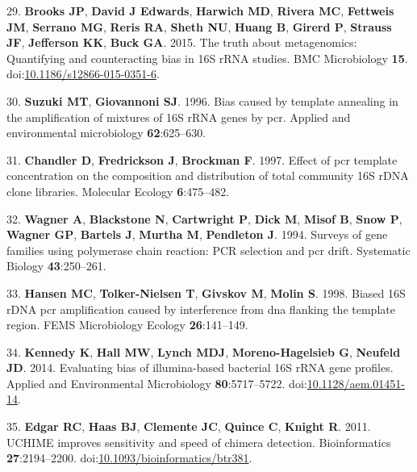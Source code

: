 \documentclass[11pt,]{article}
\begin{document}
\leavevmode\hypertarget{ref-Brooks2015}{}%
29. \textbf{Brooks JP}, \textbf{David J Edwards}, \textbf{Harwich MD},
\textbf{Rivera MC}, \textbf{Fettweis JM}, \textbf{Serrano MG},
\textbf{Reris RA}, \textbf{Sheth NU}, \textbf{Huang B}, \textbf{Girerd
P}, \textbf{Strauss JF}, \textbf{Jefferson KK}, \textbf{Buck GA}. 2015.
The truth about metagenomics: Quantifying and counteracting bias in 16S
rRNA studies. BMC Microbiology \textbf{15}.
doi:\href{https://doi.org/10.1186/s12866-015-0351-6}{10.1186/s12866-015-0351-6}.

\leavevmode\hypertarget{ref-Suzuki1996}{}%
30. \textbf{Suzuki MT}, \textbf{Giovannoni SJ}. 1996. Bias caused by
template annealing in the amplification of mixtures of 16S rRNA genes by
pcr. Applied and environmental microbiology \textbf{62}:625--630.

\leavevmode\hypertarget{ref-Chandler1997}{}%
31. \textbf{Chandler D}, \textbf{Fredrickson J}, \textbf{Brockman F}.
1997. Effect of pcr template concentration on the composition and
distribution of total community 16S rDNA clone libraries. Molecular
Ecology \textbf{6}:475--482.

\leavevmode\hypertarget{ref-Wagner1994}{}%
32. \textbf{Wagner A}, \textbf{Blackstone N}, \textbf{Cartwright P},
\textbf{Dick M}, \textbf{Misof B}, \textbf{Snow P}, \textbf{Wagner GP},
\textbf{Bartels J}, \textbf{Murtha M}, \textbf{Pendleton J}. 1994.
Surveys of gene families using polymerase chain reaction: PCR selection
and pcr drift. Systematic Biology \textbf{43}:250--261.

\leavevmode\hypertarget{ref-Hansen1998}{}%
33. \textbf{Hansen MC}, \textbf{Tolker-Nielsen T}, \textbf{Givskov M},
\textbf{Molin S}. 1998. Biased 16S rDNA pcr amplification caused by
interference from dna flanking the template region. FEMS Microbiology
Ecology \textbf{26}:141--149.

\leavevmode\hypertarget{ref-Kennedy2014}{}%
34. \textbf{Kennedy K}, \textbf{Hall MW}, \textbf{Lynch MDJ},
\textbf{Moreno-Hagelsieb G}, \textbf{Neufeld JD}. 2014. Evaluating bias
of illumina-based bacterial 16S rRNA gene profiles. Applied and
Environmental Microbiology \textbf{80}:5717--5722.
doi:\href{https://doi.org/10.1128/aem.01451-14}{10.1128/aem.01451-14}.

\leavevmode\hypertarget{ref-Edgar2011}{}%
35. \textbf{Edgar RC}, \textbf{Haas BJ}, \textbf{Clemente JC},
\textbf{Quince C}, \textbf{Knight R}. 2011. UCHIME improves sensitivity
and speed of chimera detection. Bioinformatics \textbf{27}:2194--2200.
doi:\href{https://doi.org/10.1093/bioinformatics/btr381}{10.1093/bioinformatics/btr381}.
\end{document}
